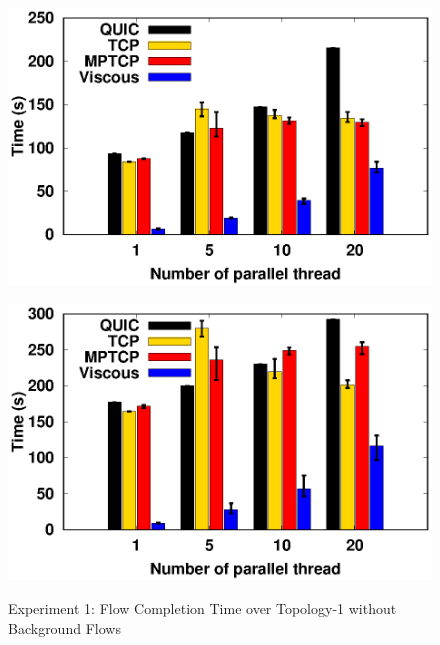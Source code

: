 \begin{figure}[!t]
\begin{center}
\begin{minipage}{0.45\linewidth}
            \label{fig:exp6_time_80}
        \end{minipage}
        \begin{minipage}{0.45\linewidth}
            \centering
            \includegraphics[width=\linewidth]{img/exp6/time_elapsed_10}
            \label{fig:exp6_time_160}
        \end{minipage}
        \begin{minipage}{0.45\linewidth}
            \centering
            \includegraphics[width=\linewidth]{img/exp6/time_elapsed_20}
            \label{fig:exp6_time_320}
        \end{minipage}
        \caption{\label{fig:exp6_time}Experiment 1: Flow Completion Time over Topology-1 without Background Flows}
    \end{center}
\end{figure}

